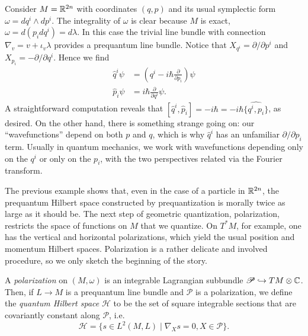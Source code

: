 \documentclass{amsart}
\begin{document}
\begin{example}
    Consider $M=\mathbb{R}^{2n}$ with coordinates $(q,p)$ and its usual symplectic form $\omega=dq^i\wedge dp^i$.
    The integrality of $\omega$ is clear because $M$ is exact, $\omega=d(p_idq^i)=d\lambda$. In this case
    the trivial line bundle with connection $\nabla_{v}=v+\iota_{v}\lambda$ provides a prequantum
    line bundle. Notice that $X_{q^i}=\partial/\partial p^i$ and $X_{p_i}=-\partial/\partial q^i$.
    Hence we find
    \begin{align*}
        \hat q^i\psi &= \left(q^i -i\hbar \frac{\partial}{\partial p_i}\right)\psi\\
        \hat p_i\psi &= i\hbar\frac{\partial}{\partial q^i}\psi.
    \end{align*}
    A straightforward computation reveals that $[\hat q^i,\hat p_i]=-i\hbar=-i\hbar\widehat{\{q^i,p_i\}}$,
    as desired. On the other hand, there is something strange going on: our ``wavefunctions'' depend
    on both $p$ and $q$, which is why $\hat q^i$ has an unfamiliar $\partial/\partial p_i$ term. 
    Usually in quantum mechanics, we work with wavefunctions depending only on the $q^i$ or only on
    the $p_i$, with the two perspectives related via the Fourier transform.
\end{example}

The previous example shows that, even in the case of a particle in $\mathbb{R}^{2n}$, the prequantum
Hilbert space constructed by prequantization is morally twice as large as it should be.
The next step of geometric quantization, polarization, restricts the space of functions on $M$
that we quantize. On $T^*M$, for example, one has the vertical and horizontal polarizations,
which yield the usual position and momentum Hilbert spaces. Polarization is a rather delicate
and involved procedure, so we only sketch the beginning of the story.

\begin{definition}
    A \textit{polarization} on $(M,\omega)$ is an integrable Lagrangian subbundle $\mathscr{P}\hookrightarrow TM\otimes\mathbb{C}$.
    Then, if $L\to M$ is a prequantum line bundle and $\mathscr{P}$ is a polarization, we define the
    \textit{quantum Hilbert space} $\mathcal{H}$ to be the set of square integrable sections
    that are covariantly constant along $\mathscr{P}$, i.e.
    \begin{equation*}
        \mathcal{H} = \{s\in L^2(M,L) \mid \nabla_Xs=0, X\in\mathscr{P}\}.
    \end{equation*}
\end{definition}
\end{document}
